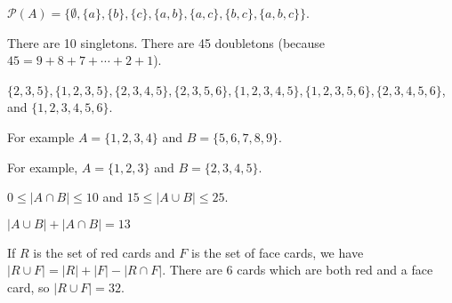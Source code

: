 \documentclass[11pt]{exam}
\def\Z{\mathbb{Z}}
\def\N{\mathbb{N}}
\def\pow{\mathcal{P}}
\def\st{~:~}
\begin{document}
\begin{questions}
\question 
 
\question $\pow(A) = \{\emptyset, \{a\}, \{b\}, \{c\}, \{a,b\}, \{a,c\}, \{b,c\}, \{a,b,c\}\}$.

\question There are 10 singletons.  There are 45 doubletons (because $45 = 9+8+7+\cdots+2+1$).


\question $\{2,3,5\}, \{1,2,3,5\}, \{2,3,4,5\}, \{2,3,5,6\}, \{1,2,3,4,5\}, \{1,2,3,5,6\}, \{2,3,4,5,6\}$, and $\{1,2,3,4,5,6\}$.


\question For example $A = \{1,2,3,4\}$ and $B = \{5,6,7,8,9\}$.

\question For example, $A = \{1,2,3\}$ and $B = \{2,3,4,5\}$.

\question $0 \le |A \cap B| \le 10$ and $15 \le |A \cup B| \le 25$.

\question $|A \cup B| + |A \cap B| = 13$


\question If $R$ is the set of red cards and $F$ is the set of face cards, we have $|R \cup F| = |R| + |F| - |R \cap F|$.  There are 6 cards which are both red and a face card, so $|R \cup F| = 32$.



\end{questions}
\end{document}
